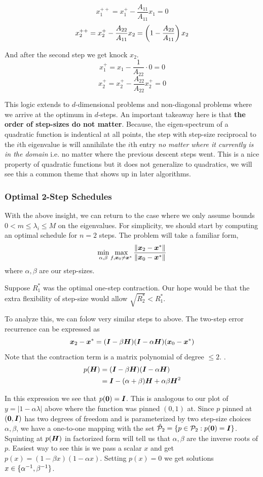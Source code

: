 \documentclass[11pt]{article}
\begin{document}
\[x^{++}_1 = x^+_1 - \frac{A_{11}}{A_{11}} x_1 = 0 \]
\[x^{++}_2 = x^+_2 - \frac{A_{22}}{A_{11}} x_2 = \left(1-\frac{A_{22}}{A_{11}}\right) x_2 \]

And after the second step we get knock $x_2$.
\[x^+_1 = x_1 - \frac{1}{A_{22}} \cdot 0 = 0 \]
\[x^+_2 = x^+_2 - \frac{A_{22}}{A_{22}} x^+_2 = 0 \]

This logic extends to $d$-dimensional problems and non-diagonal problems where we arrive at the optimum in $d$-steps. An important takeaway here is that \textbf{the order of step-sizes do not matter}. Because, the eigen-spectrum of a quadratic function is indentical at all points, the step with step-size reciprocal to the $i$th eigenvalue is will annihilate the $i$th entry \textit{no matter where it currently is in the domain} i.e. no matter where the previous descent steps went. This is a nice property of quadratic functions but it does not generalize to quadratics, we will see this a common theme that shows up in later algorithms.




\subsubsection{Optimal 2-Step Schedules}

With the above insight, we can return to the case where we only assume bounds $0<m\leq \lambda_i\leq M$ on the eigenvalues. For simplicity, we should start by computing an optimal schedule for $n=2$ steps. The problem will take a familiar form,
\[\min_{\alpha, \beta}\max_{f, \bm{x}_0\neq \bm{x}^*} \frac{\left\| \bm{x}_2-\bm{x}^* \right\|}{\left\| \bm{x}_0-\bm{x}^* \right\|}\]
where $\alpha, \beta$ are our step-sizes.

Suppose $R_1^*$ was the optimal one-step contraction. Our hope would be that the extra flexibility of step-size would allow $\sqrt{R_2^*} < R_1^*$.

To analyze this, we can folow very similar steps to above. The two-step error recurrence can be expressed as
\[\bm{x}_2 -\bm{x}^* = (\bm{I}-\beta \bm{H})(\bm{I}-\alpha \bm{H})(\bm{x}_0-\bm{x}^*)\]
Note that the contraction term is a matrix polynomial of degree $\leq 2$. 
.
\begin{align*}
p(\bm{H}) &= (\bm{I} - \beta \bm{H})(\bm{I} - \alpha \bm{H}) \\
       &= \bm{I} - (\alpha + \beta)\bm{H} + \alpha\beta \bm{H}^2
\end{align*}

In this expression we see that $p(\bm{0})=\bm{I}$. This is analogous to our plot of $y=|1-\alpha\lambda|$ above where the function was pinned $(0, 1)$ at. Since $p$ pinned at $(\bm{0}, \bm{I})$ has two degrees of freedom and is parameterized by two step-size choices $\alpha, \beta$, we have a one-to-one mapping with the set $\hat {\mathcal{P}}_2 = \{p \in \mathcal{P}_2 : p(\bm{0})=\bm{I}\} $. Squinting at $p(\bm{H})$ in factorized form will tell us that $\alpha, \beta$ are the inverse roots of $p$. Easiest way to see this is we pass a scalar $x$ and get $p(x) = (1-\beta x)(1-\alpha x)$. Setting $p(x)=0$ we get solutions $x \in \{\alpha^{-1}, \beta^{-1}\}$.
\end{document}
